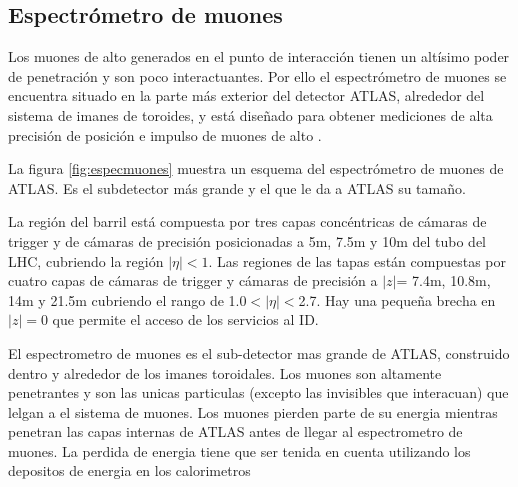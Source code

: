 \subsection{Espectrómetro de muones}

Los muones de alto {\pt} generados en el punto de interacción tienen un altísimo
poder de penetración y son poco interactuantes. Por ello el espectrómetro de
muones \cite{muonTDR} se encuentra situado en la parte más exterior del detector
ATLAS, alrededor del sistema de imanes de toroides, y está diseñado para obtener
mediciones de alta precisión de posición e impulso de muones de alto \pt.


La figura \ref{fig:especmuones} muestra un esquema del espectrómetro de muones
de ATLAS. Es el subdetector más grande y el que le da a ATLAS su tamaño.

La región del barril está compuesta por tres capas concéntricas de cámaras de
trigger y de cámaras de precisión posicionadas a 5m, 7.5m y 10m del tubo del
LHC, cubriendo la región $|\eta|<1$. Las regiones de las tapas están compuestas
por cuatro capas de cámaras de trigger y cámaras de precisión a $|z|$= 7.4m,
10.8m, 14m y 21.5m cubriendo el rango de 1.0$<|\eta|<$2.7. Hay una pequeña
brecha en $|z|=0$ que permite el acceso de los servicios al ID.

El espectrometro de muones es el sub-detector mas grande de ATLAS, construido
dentro y alrededor de los imanes toroidales. Los muones son altamente penetrantes
y son las unicas particulas (excepto las invisibles que interacuan) que lelgan
a el sistema de muones. Los muones pierden parte de su energia mientras penetran
las capas internas de ATLAS antes de llegar al espectrometro de muones. La perdida
de energia tiene que ser tenida en cuenta utilizando los depositos de energia
en los calorimetros


